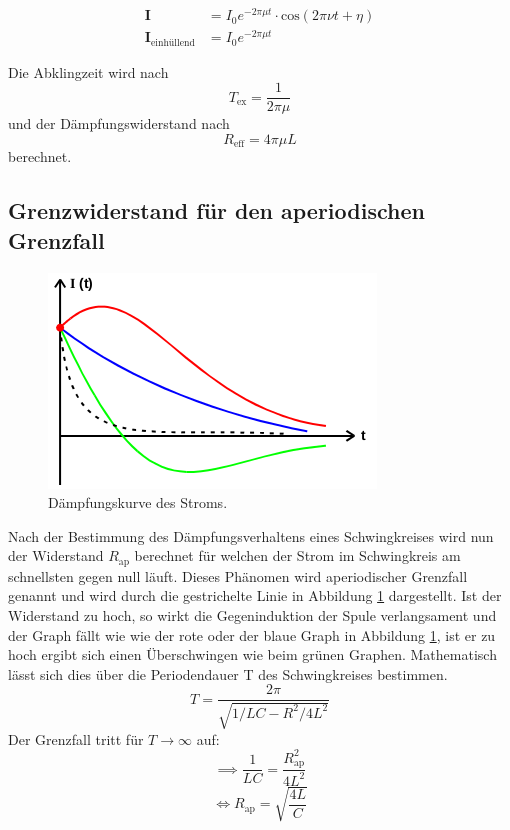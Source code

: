 \begin{align}
  \symbf{I} &= I_0 e^{-2\pi\mu t}
  \cdot\text{cos}\left(2\pi\nu t+\eta\right)\\
  \symbf{I}_\text{einhüllend} &= I_0 e^{-2\pi\mu t}
  \label{eqn:einhuellend}
\end{align}

Die Abklingzeit wird nach
\begin{equation}
  T_{\text{ex}}= \frac{1}{2\pi\mu}
  \label{tex}
\end{equation}
und der Dämpfungswiderstand nach
\begin{equation}
  R_{\text{eff}}= 4\pi\mu L
  \label{reff}
\end{equation}
berechnet.

\subsection{Grenzwiderstand für den aperiodischen Grenzfall}

\begin{figure}[H]
  \centering
  \includegraphics{content/images/dia2.png}
  \caption{Dämpfungskurve des Stroms.}
  \label{fig:aperiodisch}
\end{figure}

Nach der Bestimmung des Dämpfungsverhaltens eines Schwingkreises
wird nun der Widerstand $R_\text{ap}$ berechnet für welchen der
Strom im Schwingkreis am schnellsten gegen null läuft. Dieses
Phänomen wird aperiodischer Grenzfall genannt und wird durch
die gestrichelte Linie in Abbildung \ref{fig:aperiodisch}
dargestellt. Ist der Widerstand zu hoch, so wirkt die Gegeninduktion der
Spule verlangsament und der Graph fällt wie wie der rote oder der
blaue Graph in Abbildung \ref{fig:aperiodisch}, ist er zu hoch
ergibt sich einen Überschwingen wie beim grünen Graphen.
Mathematisch lässt sich dies über die Periodendauer T des
Schwingkreises bestimmen.
\begin{equation}
  T = \frac{2\pi}{\sqrt{1/LC-R^2/4L^2}}
\end{equation}
Der Grenzfall tritt für $T\to\infty$ auf:
\begin{equation}
  \implies \frac{1}{LC}=\frac{R_\text{ap}^2}{4L^2}
\end{equation}
\begin{equation}
  \iff R_\text{ap} =\sqrt{\frac{4L}{C}}
  \label{eqn:R11}
\end{equation}

